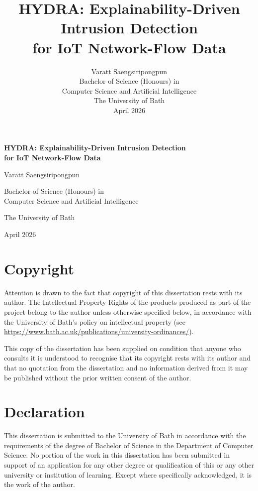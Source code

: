 \documentclass[12pt,a4paper]{report}
\title{\textbf{HYDRA: Explainability-Driven Intrusion Detection\\for IoT Network-Flow Data}}
\author{Varatt Saengsiripongpun\\[1em]
Bachelor of Science (Honours) in\\Computer Science and Artificial Intelligence\\[1em]
The University of Bath\\[1em]
April 2026}
\date{}
\begin{document}

\begin{titlepage}
\centering
\vspace*{\fill}
\vspace*{-2cm}
{\LARGE\bfseries HYDRA: Explainability-Driven Intrusion Detection\\[0.3em] for IoT Network-Flow Data\par}
\vspace{2cm}
{\Large Varatt Saengsiripongpun\par}
\vspace{1.5cm}
{\large Bachelor of Science (Honours) in\\Computer Science and Artificial Intelligence\par}
\vspace{1cm}
{\large The University of Bath\par}
\vspace{0.5cm}
{\large April 2026\par}
\vspace*{\fill}
\vspace*{\fill}
\end{titlepage}

\newpage
\thispagestyle{empty}
\section*{Copyright}
Attention is drawn to the fact that copyright of this dissertation rests with its author. The Intellectual Property Rights of the products produced as part of the project belong to the author unless otherwise specified below, in accordance with the University of Bath's policy on intellectual property (see \url{https://www.bath.ac.uk/publications/university-ordinances/}).

This copy of the dissertation has been supplied on condition that anyone who consults it is understood to recognise that its copyright rests with its author and that no quotation from the dissertation and no information derived from it may be published without the prior written consent of the author.

\section*{Declaration}
This dissertation is submitted to the University of Bath in accordance with the requirements of the degree of Bachelor of Science in the Department of Computer Science. No portion of the work in this dissertation has been submitted in support of an application for any other degree or qualification of this or any other university or institution of learning. Except where specifically acknowledged, it is the work of the author.
\end{document}
